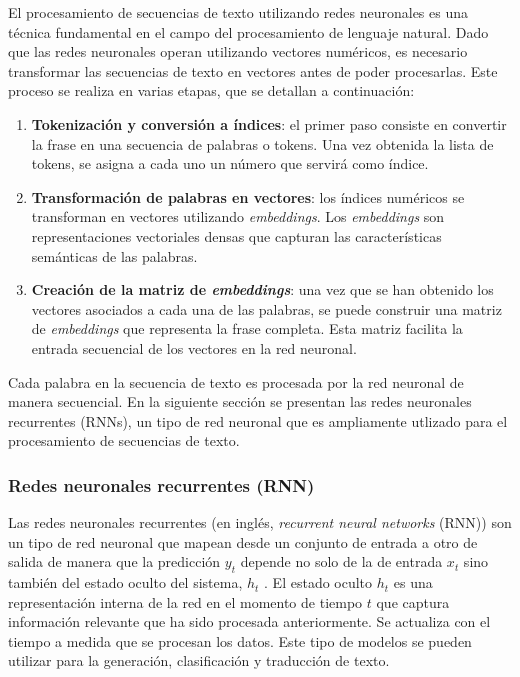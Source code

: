 \documentclass[11pt,spanish,listoffigures,listoftables]{tfgetsinf}
\begin{document}

El procesamiento de secuencias de texto utilizando redes neuronales es una técnica fundamental en el campo del procesamiento de lenguaje natural. Dado que las redes neuronales operan utilizando vectores numéricos, es necesario transformar las secuencias de texto en vectores antes de poder procesarlas. Este proceso se realiza en varias etapas, que se detallan a continuación:

\begin{enumerate}
	\item \textbf{Tokenización y conversión a índices}: el primer paso consiste en convertir la frase en una secuencia de palabras o tokens. Una vez obtenida la lista de tokens, se asigna a cada uno un número que servirá como índice.
	\item \textbf{Transformación de palabras en vectores}: los índices numéricos se transforman en vectores utilizando \textit{embeddings}. Los \textit{embeddings} son representaciones vectoriales densas que capturan las características semánticas de las palabras.
	\item \textbf{Creación de la matriz de \textit{embeddings}}: una vez que se han obtenido los vectores asociados a cada una de las palabras, se puede construir una matriz de \textit{embeddings} que representa la frase completa. Esta matriz facilita la entrada secuencial de los vectores en la red neuronal.
\end{enumerate}

Cada palabra en la secuencia de texto es procesada por la red neuronal de manera secuencial. En la siguiente sección se presentan las redes neuronales recurrentes (RNNs), un tipo de red neuronal que es ampliamente utlizado para el procesamiento de secuencias de texto.

\subsubsection{Redes neuronales recurrentes (RNN)} \label{rnn}
Las redes neuronales recurrentes (en inglés, \textit{recurrent neural networks} (RNN)) son un tipo de red neuronal que mapean desde un conjunto de entrada a otro de salida de manera que la predicción $y_t$ depende no solo de la de entrada $x_t$ sino también del estado oculto del sistema, $h_t$ \cite{murphy2022probabilistic}. El estado oculto $h_t$ es una representación interna de la red en el momento de tiempo $t$ que captura información relevante que ha sido procesada anteriormente. Se actualiza con el tiempo a medida que se procesan los datos. Este tipo de modelos se pueden utilizar para la generación, clasificación y traducción de texto.
\end{document}

